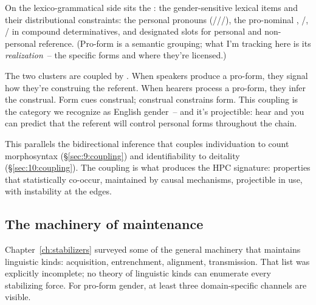On the lexico-grammatical side sits the : the gender-sensitive lexical items and their distributional constraints: the personal pronouns (///), the pro-nominal , /, / in compound determinatives, and designated slots for personal and non-personal reference. (Pro-form is a semantic grouping; what I'm tracking here is its \emph{realization}~-- the specific forms and where they're licensed.)

The two clusters are coupled by . When speakers produce a pro-form, they signal how they're construing the referent. When hearers process a pro-form, they infer the construal. Form cues construal; construal constrains form. This coupling is the category we recognize as English gender~-- and it's projectible: hear  and you can predict that the referent will control personal forms throughout the chain.

This parallels the bidirectional inference that couples individuation to count morphosyntax (§\ref{sec:9:coupling}) and identifiability to deitality (§\ref{sec:10:coupling}). The coupling is what produces the HPC signature: properties that statistically co-occur, maintained by causal mechanisms, projectible in use, with instability at the edges.

\subsection{The machinery of maintenance}
\label{sec:12:maintenance}

Chapter~\ref{ch:stabilizers} surveyed some of the general machinery that maintains linguistic kinds: acquisition, entrenchment, alignment, transmission. That list was explicitly incomplete; no theory of linguistic kinds can enumerate every stabilizing force. For pro-form gender, at least three domain-specific channels are visible.


